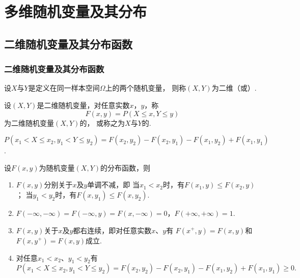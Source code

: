 \chapter{多维随机变量及其分布}
\section{二维随机变量及其分布函数}
\subsection{二维随机变量及其分布函数}
\begin{definition}
设\(X\)与\(Y\)是定义在同一样本空间\(\Omega\)上的两个随机变量，
则称\((X,Y)\)为二维（或）.
\end{definition}

\begin{definition}
设\((X,Y)\)是二维随机变量，对任意实数\(x\)，\(y\)，称\begin{equation}\label{equation:多维随机变量及其分布.二维分布函数的定义式}
F(x,y) = P(X \leq x, Y \leq y)
\end{equation}为二维随机变量\((X,Y)\)的，
或称之为\(X\)与\(Y\)的.
\end{definition}

\begin{property}
\(P(x_1 < X \leq x_2, y_1 < Y \leq y_2)
= F(x_2,y_2) - F(x_2,y_1) - F(x_1,y_2) + F(x_1,y_1)\).
\end{property}

\begin{property}
设\(F(x,y)\)为随机变量\((X,Y)\)的分布函数，则
\begin{enumerate}
	\item \(F(x,y)\)分别关于\(x\)及\(y\)单调不减，即
	当\(x_1 < x_2\)时，有\(F(x_1,y) \leq F(x_2,y)\)；
	当\(y_1 < y_2\)时，有\(F(x,y_1) \leq F(x,y_2)\).

	\item \(F(-\infty,-\infty)=F(-\infty,y)=F(x,-\infty)=0\)，\(F(+\infty,+\infty)=1\).

	\item \(F(x,y)\)关于\(x\)及\(y\)都右连续，即对任意实数\(x\)、\(y\)有
	\(F(x^+,y)=F(x,y)\)和\(F(x,y^+)=F(x,y)\)成立.

	\item 对任意\(x_1 < x_2\)、\(y_1 < y_2\)有\[
		P(x_1 < X \leq x_2, y_1 < Y \leq y_2)
		= F(x_2,y_2) - F(x_2,y_1) - F(x_1,y_2) + F(x_1,y_1)
		\geq 0.
	\]
\end{enumerate}
\end{property}

